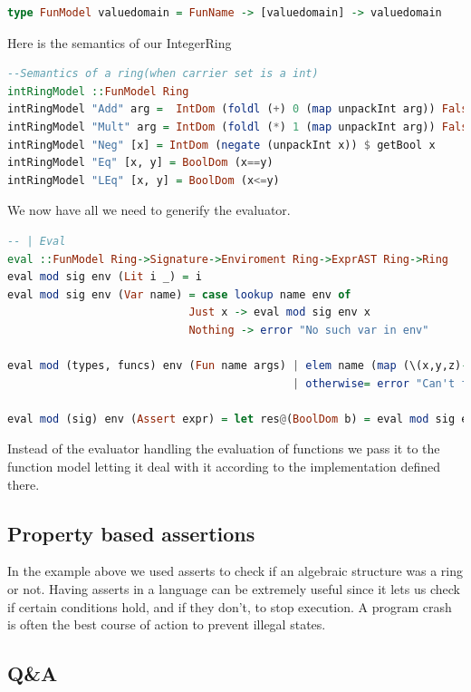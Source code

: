 \documentclass[tikz, border=5mm]{article}
\begin{document}
        \begin{lstlisting}[language=Haskell]
type FunModel valuedomain = FunName -> [valuedomain] -> valuedomain
        \end{lstlisting}
        Here is the semantics of our IntegerRing
        \begin{lstlisting}[language=Haskell]
--Semantics of a ring(when carrier set is a int)
intRingModel ::FunModel Ring
intRingModel "Add" arg =  IntDom (foldl (+) 0 (map unpackInt arg)) False
intRingModel "Mult" arg = IntDom (foldl (*) 1 (map unpackInt arg)) False
intRingModel "Neg" [x] = IntDom (negate (unpackInt x)) $ getBool x
intRingModel "Eq" [x, y] = BoolDom (x==y)
intRingModel "LEq" [x, y] = BoolDom (x<=y)
        \end{lstlisting}
        We now have all we need to generify the evaluator.
        \begin{lstlisting}[language=Haskell]
-- | Eval
eval ::FunModel Ring->Signature->Enviroment Ring->ExprAST Ring->Ring
eval mod sig env (Lit i _) = i
eval mod sig env (Var name) = case lookup name env of
                            Just x -> eval mod sig env x
                            Nothing -> error "No such var in env"

eval mod (types, funcs) env (Fun name args) | elem name (map (\(x,y,z)->x) funcs) =mod name (map (eval mod (types, funcs) env) args)
                                            | otherwise= error "Can't find function in signature"

eval mod (sig) env (Assert expr) = let res@(BoolDom b) = eval mod sig env expr in if b then res else error $"Assert did not hold"++ (show expr)

        \end{lstlisting}
        Instead of the evaluator handling the evaluation of functions we pass it to the function model letting it deal with it according to the implementation defined there.
        \subsection{Property based assertions}
        In the example above we used asserts to check if an algebraic structure was a ring or not. Having asserts in a language can be extremely useful since it lets us check if certain conditions hold, and if they don't, to stop execution.
        A program crash is often the best course of action to prevent illegal states. 
        \subsection{Q\&A}
\end{document}
